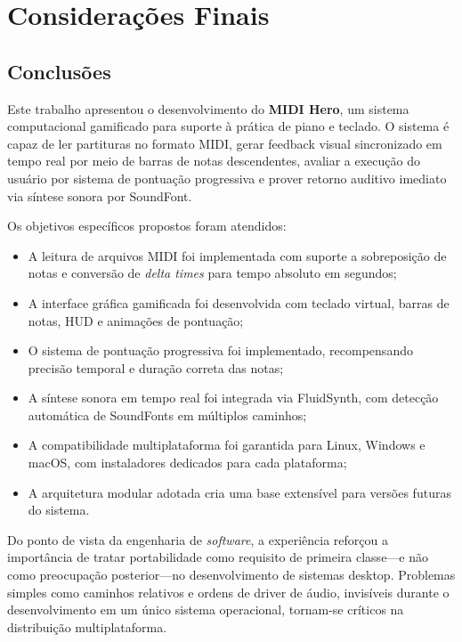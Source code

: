 \documentclass[
  12pt,
  openright,
  twoside,
  a4paper,
  english,
  brazil
]{abntex2}
\begin{document}
\chapter{Considerações Finais}

\section{Conclusões}

Este trabalho apresentou o desenvolvimento do \textbf{MIDI Hero}, um
sistema computacional gamificado para suporte à prática de piano e
teclado. O sistema é capaz de ler partituras no formato MIDI, gerar
feedback visual sincronizado em tempo real por meio de barras de notas
descendentes, avaliar a execução do usuário por sistema de pontuação
progressiva e prover retorno auditivo imediato via síntese sonora por
SoundFont.

Os objetivos específicos propostos foram atendidos:

\begin{itemize}
  \item A leitura de arquivos MIDI foi implementada com suporte a
        sobreposição de notas e conversão de \textit{delta times} para
        tempo absoluto em segundos;
  \item A interface gráfica gamificada foi desenvolvida com teclado
        virtual, barras de notas, HUD e animações de pontuação;
  \item O sistema de pontuação progressiva foi implementado,
        recompensando precisão temporal e duração correta das notas;
  \item A síntese sonora em tempo real foi integrada via FluidSynth,
        com detecção automática de SoundFonts em múltiplos caminhos;
  \item A compatibilidade multiplataforma foi garantida para Linux,
        Windows e macOS, com instaladores dedicados para cada plataforma;
  \item A arquitetura modular adotada cria uma base extensível para
        versões futuras do sistema.
\end{itemize}

Do ponto de vista da engenharia de \textit{software}, a experiência
reforçou a importância de tratar portabilidade como requisito de
primeira classe---e não como preocupação posterior---no desenvolvimento
de sistemas desktop. Problemas simples como caminhos relativos e ordens
de driver de áudio, invisíveis durante o desenvolvimento em um único
sistema operacional, tornam-se críticos na distribuição multiplataforma.
\end{document}
